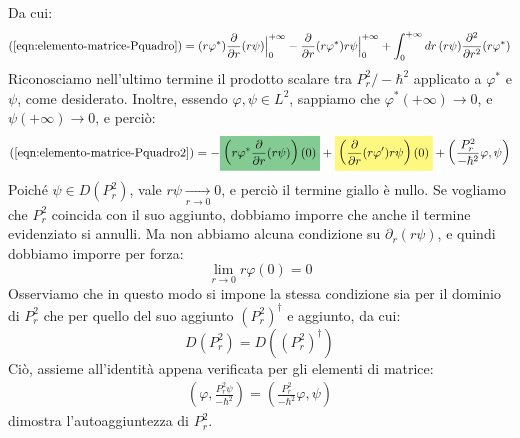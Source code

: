 \documentclass[../../FisicaTeorica.tex]{subfiles}
\begin{document}
Da cui:
\begin{align}
(\ref{eqn:elemento-matrice-Pquadro})=(r\varphi^*)\frac{\partial}{\partial r}(r\psi)\Big|_0^{+\infty} -\frac{\partial}{\partial r}(r\varphi^*)r\psi\Big|_0^{+\infty} + \int_0^{+\infty}dr\,(r\psi) \frac{\partial^2}{\partial r^2}(r\varphi^*)
\label{eqn:elemento-matrice-Pquadro2}
\end{align}
Riconosciamo nell'ultimo termine il prodotto scalare tra $P_r^2/-\hbar^2$ applicato a $\varphi^*$ e $\psi$, come desiderato. Inoltre, essendo $\varphi, \psi \in L^2$, sappiamo che $\varphi^*(+\infty)\to 0$, e $\psi(+\infty)\to 0$, e perciò:
\begin{align*}
(\ref{eqn:elemento-matrice-Pquadro2})=-\hlc{ForestGreen}{\left(r\varphi^*\frac{\partial}{\partial r}(r\psi)\right)(0)} +\hlc{Yellow}{ \left(\frac{\partial}{\partial r}(r\varphi')r\psi\right)(0)} + \left(\frac{P_r^2}{-\hbar^2}\varphi,\psi\right)
\end{align*}
Poiché $\psi \in D(P_r^2)$, vale $r\psi \xrightarrow[r\to0]{}0$, e perciò il termine giallo è nullo. Se vogliamo che $P_r^2$ coincida con il suo aggiunto, dobbiamo imporre che anche il termine evidenziato si annulli. Ma non abbiamo alcuna condizione su $\partial_r(r\psi)$, e quindi dobbiamo imporre per forza:
\[
\lim_{r \to 0} r\varphi(0) = 0
\]
Osserviamo che in questo modo si impone la stessa condizione sia per il dominio di $P_r^2$ che per quello del suo aggiunto $(P_r^2)^\dag$ e aggiunto, da cui:
\[
D(P_r^2) = D((P_r^2)^\dag)
\]
Ciò, assieme all'identità appena verificata per gli elementi di matrice:
\begin{align*}
\left(\varphi, \frac{P_r^2 \psi}{-\hbar^2}\right)=\left(\frac{P_r^2}{-\hbar^2}\varphi,\psi\right)
\end{align*}
dimostra l'autoaggiuntezza di $P_r^2$.\\
\end{document}
